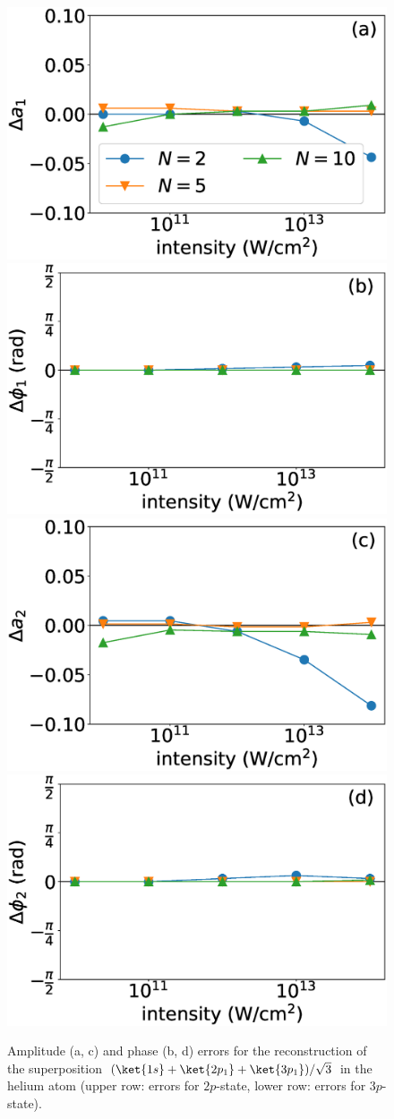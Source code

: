 \begin{figure}[!ht]
\centering
\includegraphics[width=0.48\linewidth]{figs/Photo_ionization/superpositions/Venzke_new_fig_10a.eps}
\includegraphics[width=0.48\linewidth]{figs/Photo_ionization/superpositions/Venzke_new_fig_10b.eps}\\
\includegraphics[width=0.48\linewidth]{figs/Photo_ionization/superpositions/Venzke_new_fig_10c.eps}
\includegraphics[width=0.48\linewidth]{figs/Photo_ionization/superpositions/Venzke_new_fig_10d.eps}

\caption{
Amplitude (a, c) and phase (b, d) errors for the reconstruction of the superposition $(\ket{1s}+\ket{2p_1}+\ket{3p_1})/\sqrt{3}$ in the helium atom (upper row: errors for $2p$-state, lower row: errors for $3p$-state). 
} 
  \label{fig:3-state}
\end{figure}

